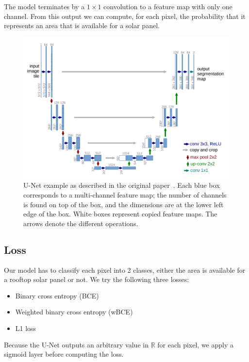 \documentclass[10pt,conference]{IEEEtran}
\begin{document}
The model terminates by a $1 \times 1$ convolution to a feature map with only one channel.
From this output we can compute, for each pixel, the probability that it represents an area that is available for a solar panel.

\begin{figure}[tbp]
    \centering
    \includegraphics[width=.8\columnwidth]{report/images/UNet.png}
    \caption{
        U-Net example as described in the original paper~\cite{ronneberger2015unet}.
        Each blue box corresponds to a multi-channel feature map; the number of channels is found on top of the box, and the dimensions are at the lower left edge of the box.
        White boxes represent copied feature maps.
        The arrows denote the different operations.
    }
    \label{fig:UNetarchitecture}
\end{figure}

\subsection{Loss}\label{loss}
Our model has to classify each pixel into 2 classes, either the area is available for a rooftop solar panel or not. We try the following three losses:
\begin{itemize}
    \item Binary cross entropy (BCE)
    \item Weighted binary cross entropy (wBCE)
    \item L1 loss
\end{itemize}
Because the U-Net outputs an arbitrary value in $\mathbb{R}$ for each pixel, we apply a sigmoid layer before computing the loss.
\end{document}
